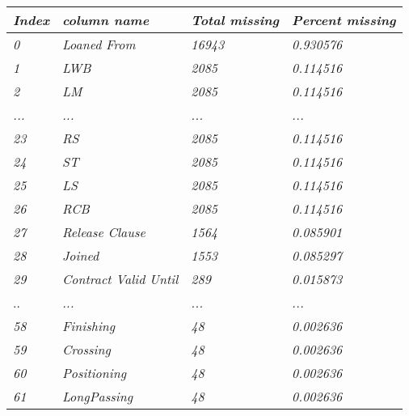 \documentclass{article}
\begin{document}
\begin{table}[]
\centering
\begin{tabular}{|l|l|l|l|}
\hline
\textit{Index} & \textit{column name}          & \textit{Total missing} & \textit{Percent missing} \\ \hline
\textit{0}     & \textit{Loaned From}          & \textit{16943}         & \textit{0.930576}        \\ \hline
\textit{1}     & \textit{LWB}                  & \textit{2085}          & \textit{0.114516}        \\ \hline
\textit{2}     & \textit{LM}                   & \textit{2085}          & \textit{0.114516}        \\ \hline
\textit{...}   & \textit{...}                  & \textit{...}           & \textit{...}             \\ \hline
\textit{23}    & \textit{RS}                   & \textit{2085}          & \textit{0.114516}        \\ \hline
\textit{24}    & \textit{ST}                   & \textit{2085}          & \textit{0.114516}        \\ \hline
\textit{25}    & \textit{LS}                   & \textit{2085}          & \textit{0.114516}        \\ \hline
\textit{26}    & \textit{RCB}                  & \textit{2085}          & \textit{0.114516}        \\ \hline
\textit{27}    & \textit{Release Clause}       & \textit{1564}          & \textit{0.085901}        \\ \hline
\textit{28}    & \textit{Joined}               & \textit{1553}          & \textit{0.085297}        \\ \hline
\textit{29}    & \textit{Contract Valid Until} & \textit{289}           & \textit{0.015873}        \\ \hline
..             & \textit{...}                  & \textit{...}           & \textit{...}             \\ \hline
\textit{58}    & \textit{Finishing}            & \textit{48}            & \textit{0.002636}        \\ \hline
\textit{59}    & \textit{Crossing}             & \textit{48}            & \textit{0.002636}        \\ \hline
\textit{60}    & \textit{Positioning}          & \textit{48}            & \textit{0.002636}        \\ \hline
\textit{61}    & \textit{LongPassing}          & \textit{48}            & \textit{0.002636}        \\ \hline

\end{tabular}
\end{table}
\end{document}
